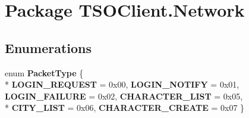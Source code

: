 \hypertarget{namespace_t_s_o_client_1_1_network}{\section{Package T\+S\+O\+Client.\+Network}
\label{namespace_t_s_o_client_1_1_network}
}
\subsection*{Enumerations}
\begin{DoxyCompactItemize}
\item 
\hypertarget{namespace_t_s_o_client_1_1_network_ab97a9534654a3176267c5a88c425e85b}{enum {\bfseries Packet\+Type} \{ \\*
{\bfseries L\+O\+G\+I\+N\+\_\+\+R\+E\+Q\+U\+E\+S\+T} = 0x00, 
{\bfseries L\+O\+G\+I\+N\+\_\+\+N\+O\+T\+I\+F\+Y} = 0x01, 
{\bfseries L\+O\+G\+I\+N\+\_\+\+F\+A\+I\+L\+U\+R\+E} = 0x02, 
{\bfseries C\+H\+A\+R\+A\+C\+T\+E\+R\+\_\+\+L\+I\+S\+T} = 0x05, 
\\*
{\bfseries C\+I\+T\+Y\+\_\+\+L\+I\+S\+T} = 0x06, 
{\bfseries C\+H\+A\+R\+A\+C\+T\+E\+R\+\_\+\+C\+R\+E\+A\+T\+E} = 0x07
 \}}\label{namespace_t_s_o_client_1_1_network_ab97a9534654a3176267c5a88c425e85b}

\end{DoxyCompactItemize}
